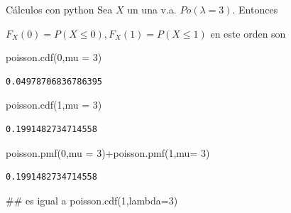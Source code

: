 \documentclass[
  ignorenonframetext,
  aspectratio=169]{beamer}
\newenvironment{Shaded}{\begin{snugshade}}{\end{snugshade}}
\newcommand{\CommentTok}[1]{\textcolor[rgb]{0.37,0.37,0.37}{#1}}
\newcommand{\DecValTok}[1]{\textcolor[rgb]{0.68,0.00,0.00}{#1}}
\newcommand{\NormalTok}[1]{\textcolor[rgb]{0.00,0.23,0.31}{#1}}
\newcommand{\OperatorTok}[1]{\textcolor[rgb]{0.37,0.37,0.37}{#1}}
\begin{document}
\begin{frame}[fragile]{Cálculos con python}
\protect\hypertarget{cuxe1lculos-con-python-5}{}
Sea \(X\) un una v.a. \(Po(\lambda=3)\). Entonces

\(F_X(0)=P(X\leq 0), F_X(1)=P(X\leq 1)\) en este orden son

\begin{Shaded}
\begin{Highlighting}[]
\NormalTok{poisson.cdf(}\DecValTok{0}\NormalTok{,mu }\OperatorTok{=} \DecValTok{3}\NormalTok{)}
\end{Highlighting}
\end{Shaded}

\begin{verbatim}
0.04978706836786395
\end{verbatim}

\begin{Shaded}
\begin{Highlighting}[]
\NormalTok{poisson.cdf(}\DecValTok{1}\NormalTok{,mu }\OperatorTok{=} \DecValTok{3}\NormalTok{)}
\end{Highlighting}
\end{Shaded}

\begin{verbatim}
0.1991482734714558
\end{verbatim}

\begin{Shaded}
\begin{Highlighting}[]
\NormalTok{poisson.pmf(}\DecValTok{0}\NormalTok{,mu }\OperatorTok{=} \DecValTok{3}\NormalTok{)}\OperatorTok{+}\NormalTok{poisson.pmf(}\DecValTok{1}\NormalTok{,mu}\OperatorTok{=} \DecValTok{3}\NormalTok{) }
\end{Highlighting}
\end{Shaded}

\begin{verbatim}
0.1991482734714558
\end{verbatim}

\begin{Shaded}
\begin{Highlighting}[]
\CommentTok{\#\# es igual a poisson.cdf(1,lambda=3)}
\end{Highlighting}
\end{Shaded}
\end{frame}
\end{document}
